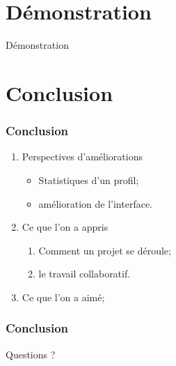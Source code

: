 \documentclass[12pt]{beamer}
\begin{document}
\section{Démonstration}
    \begin{frame}{Démonstration}
    \end{frame}

\section{Conclusion}
    \begin{frame}
    \frametitle{Conclusion}
        
        \begin{enumerate}
            \item Perspectives d'améliorations
            \begin{itemize}
                \item Statistiques d'un profil;
                \item amélioration de l'interface.
            \end{itemize}
            
            \pause
            \item Ce que l'on a appris
            \begin{enumerate}
                \item Comment un projet se déroule;
                \item le travail collaboratif.
            \end{enumerate}
            
            \pause
            \item Ce que l'on a aimé;
            
         
        \end{enumerate}
    \end{frame}
    
    \begin{frame}
    \frametitle{Conclusion}
        {\Huge Questions ?}
    \end{frame}
\end{document}
